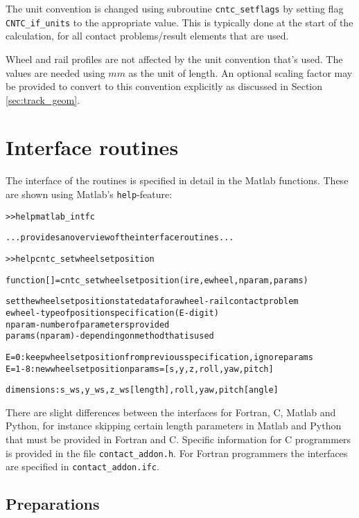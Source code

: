 \documentclass[12pt]{report}
\begin{document}
The unit convention is changed using subroutine {\tt cntc\_setflags} by
setting flag {\tt CNTC\_\-if\_\-units} to the appropriate value. This is
typically done at the start of the calculation, for all contact
problems/result elements that are used.

Wheel and rail profiles are not affected by the unit convention that's used.
The values are needed using $\unit{mm}$ as the unit of length. An optional
scaling factor may be provided to convert to this convention explicitly as
discussed in Section \ref{sec:track_geom}.

\section{Interface routines}
\label{sec:clib_interface}

The interface of the routines is specified in detail in the Matlab
functions. These are shown using Matlab's {\tt help}-feature:
\begin{alltt}\small
>> help matlab_intfc

   ... provides an overview of the interface routines ...

>> help cntc_setwheelsetposition

   function [ ] = cntc_setwheelsetposition(ire, ewheel, nparam, params) 
 
   set the wheelset position state data for a wheel-rail contact problem
     ewheel         - type of position specification (E-digit)
     nparam         - number of parameters provided
     params(nparam) - depending on method that is used

   E=0  : keep wheelset position from previous specification, ignore params
   E=1-8: new wheelset position   params = [s, y, z, roll, yaw, pitch]
 
   dimensions:   s_ws, y_ws, z_ws [length],       roll, yaw, pitch [angle]
\end{alltt}
There are slight differences between the interfaces for Fortran, C, Matlab
and Python, for instance skipping certain length parameters in Matlab and
Python that must be provided in Fortran and C. Specific information for C
programmers is provided in the file {\tt contact\_addon.h}. For Fortran
programmers the interfaces are specified in {\tt contact\_addon.ifc}.

\subsection{Preparations}
\label{sec:cntc_preparations}
\end{document}
